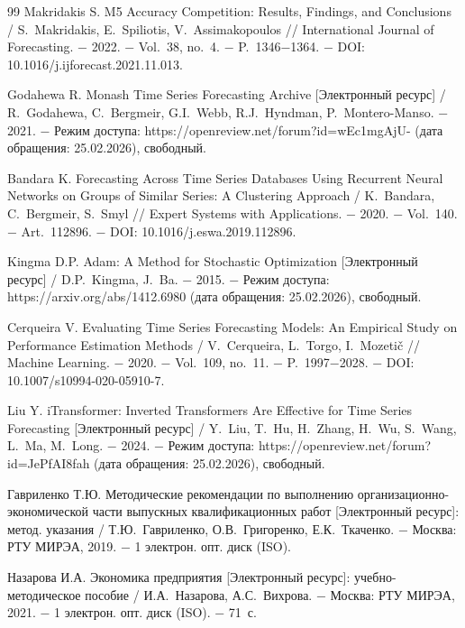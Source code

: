 \documentclass[a4paper,14pt]{extarticle}
\begin{document}
\begin{thebibliography}{99}
 Makridakis S. M5 Accuracy Competition: Results, Findings, and Conclusions / S.~Makridakis, E.~Spiliotis, V.~Assimakopoulos // International Journal of Forecasting. − 2022. − Vol.~38, no.~4. − P.~1346−1364. − DOI: 10.1016/j.ijforecast.2021.11.013.

 Godahewa R. Monash Time Series Forecasting Archive [Электронный ресурс] / R.~Godahewa, C.~Bergmeir, G.I.~Webb, R.J.~Hyndman, P.~Montero-Manso. − 2021. − Режим доступа: https://openreview.net/forum?id=wEc1mgAjU- (дата обращения: 25.02.2026), свободный.

 Bandara K. Forecasting Across Time Series Databases Using Recurrent Neural Networks on Groups of Similar Series: A Clustering Approach / K.~Bandara, C.~Bergmeir, S.~Smyl // Expert Systems with Applications. − 2020. − Vol.~140. − Art.~112896. − DOI: 10.1016/j.eswa.2019.112896.

 Kingma D.P. Adam: A Method for Stochastic Optimization [Электронный ресурс] / D.P.~Kingma, J.~Ba. − 2015. − Режим доступа: https://arxiv.org/abs/1412.6980 (дата обращения: 25.02.2026), свободный.

 Cerqueira V. Evaluating Time Series Forecasting Models: An Empirical Study on Performance Estimation Methods / V.~Cerqueira, L.~Torgo, I.~Mozetič // Machine Learning. − 2020. − Vol.~109, no.~11. − P.~1997−2028. − DOI: 10.1007/s10994-020-05910-7.

 Liu Y. iTransformer: Inverted Transformers Are Effective for Time Series Forecasting [Электронный ресурс] / Y.~Liu, T.~Hu, H.~Zhang, H.~Wu, S.~Wang, L.~Ma, M.~Long. − 2024. − Режим доступа: https://openreview.net/forum?id=JePfAI8fah (дата обращения: 25.02.2026), свободный.

 Гавриленко Т.Ю. Методические рекомендации по выполнению организационно-экономической части выпускных квалификационных работ [Электронный ресурс]: метод. указания / Т.Ю.~Гавриленко, О.В.~Григоренко, Е.К.~Ткаченко. − Москва: РТУ МИРЭА, 2019. − 1 электрон. опт. диск (ISO).

 Назарова И.А. Экономика предприятия [Электронный ресурс]: учебно-методическое пособие / И.А.~Назарова, А.С.~Вихрова. − Москва: РТУ МИРЭА, 2021. − 1 электрон. опт. диск (ISO). − 71~с.

\end{thebibliography}
\end{document}
